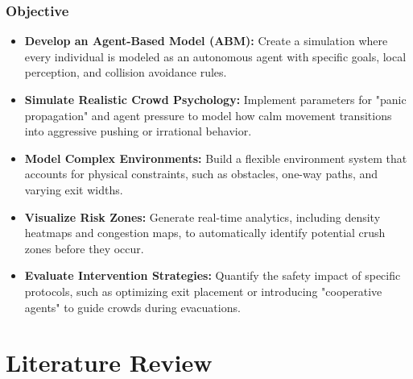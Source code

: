 \documentclass{beamer}
\begin{document}
\begin{frame}
\frametitle{Objective}
\footnotesize 


\begin{itemize}
    \item \textbf{Develop an Agent-Based Model (ABM):} Create a simulation where every individual is modeled as an autonomous agent with specific goals, local perception, and collision avoidance rules.
    \item \textbf{Simulate Realistic Crowd Psychology:} Implement parameters for "panic propagation" and agent pressure to model how calm movement transitions into aggressive pushing or irrational behavior.
    \item \textbf{Model Complex Environments:} Build a flexible environment system that accounts for physical constraints, such as obstacles, one-way paths, and varying exit widths.
    \item \textbf{Visualize Risk Zones:} Generate real-time analytics, including density heatmaps and congestion maps, to automatically identify potential crush zones before they occur.
    \item \textbf{Evaluate Intervention Strategies:} Quantify the safety impact of specific protocols, such as optimizing exit placement or introducing "cooperative agents" to guide crowds during evacuations.
\end{itemize}
\end{frame}

\section{Literature Review}
\end{document}
